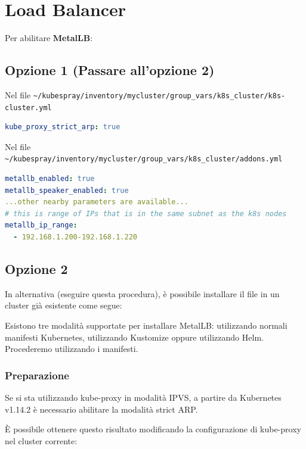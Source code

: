 \documentclass[11pt, a4paper]{article}
\begin{document}
\section{Load Balancer}

Per abilitare \textbf{MetalLB}:

\subsection*{Opzione 1 (Passare all'opzione 2)}

Nel file \texttt{\textasciitilde/kubespray/inventory/mycluster/group\_vars/k8s\_cluster/k8s-cluster.yml}

\begin{lstlisting}[language=yaml]
kube_proxy_strict_arp: true
\end{lstlisting}


Nel file \texttt{\textasciitilde/kubespray/inventory/mycluster/group\_vars/k8s\_cluster/addons.yml}

\begin{lstlisting}[language=yaml]
metallb_enabled: true
metallb_speaker_enabled: true
...other nearby parameters are available...
# this is range of IPs that is in the same subnet as the k8s nodes
metallb_ip_range:
  - 192.168.1.200-192.168.1.220
\end{lstlisting}

\subsection*{Opzione 2}

In alternativa (eseguire questa procedura), è possibile installare il file in un cluster già esistente come segue:

Esistono tre modalità supportate per installare MetalLB: utilizzando normali manifesti Kubernetes, utilizzando Kustomize oppure utilizzando Helm. Procederemo utilizzando i manifesti.

\subsubsection*{Preparazione}

Se si sta utilizzando kube-proxy in modalità IPVS, a partire da Kubernetes v1.14.2 è necessario abilitare la modalità strict ARP.

È possibile ottenere questo risultato modificando la configurazione di kube-proxy nel cluster corrente:
\end{document}
